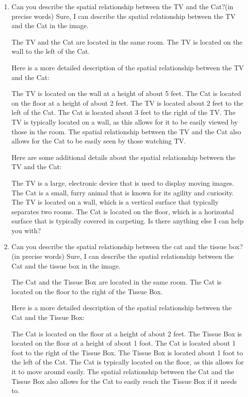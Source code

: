 \begin{enumerate}
    \item Can you describe the spatial relationship between the TV and the Cat?(in precise words)
    \subitem 
    Sure, I can describe the spatial relationship between the TV and the Cat in the image.
    
    The TV and the Cat are located in the same room. The TV is located on the wall to the left of the Cat.
    
    Here is a more detailed description of the spatial relationship between the TV and the Cat:
    
    The TV is located on the wall at a height of about 5 feet.
    The Cat is located on the floor at a height of about 2 feet.
    The TV is located about 2 feet to the left of the Cat.
    The Cat is located about 3 feet to the right of the TV.
    The TV is typically located on a wall, as this allows for it to be easily viewed by those in the room. The spatial relationship between the TV and the Cat also allows for the Cat to be easily seen by those watching TV.
    
    Here are some additional details about the spatial relationship between the TV and the Cat:
    
    The TV is a large, electronic device that is used to display moving images.
    The Cat is a small, furry animal that is known for its agility and curiosity.
    The TV is located on a wall, which is a vertical surface that typically separates two rooms.
    The Cat is located on the floor, which is a horizontal surface that is typically covered in carpeting.
    Is there anything else I can help you with?
    \item Can you describe the spatial relationship between the cat and the tissue box?(in precise words)
    \subitem Sure, I can describe the spatial relationship between the Cat and the tissue box in the image.

    The Cat and the Tissue Box are located in the same room. The Cat is located on the floor to the right of the Tissue Box.
    
    Here is a more detailed description of the spatial relationship between the Cat and the Tissue Box:
    
    The Cat is located on the floor at a height of about 2 feet.
    The Tissue Box is located on the floor at a height of about 1 foot.
    The Cat is located about 1 foot to the right of the Tissue Box.
    The Tissue Box is located about 1 foot to the left of the Cat.
    The Cat is typically located on the floor, as this allows for it to move around easily. The spatial relationship between the Cat and the Tissue Box also allows for the Cat to easily reach the Tissue Box if it needs to.
    

\end{enumerate}
